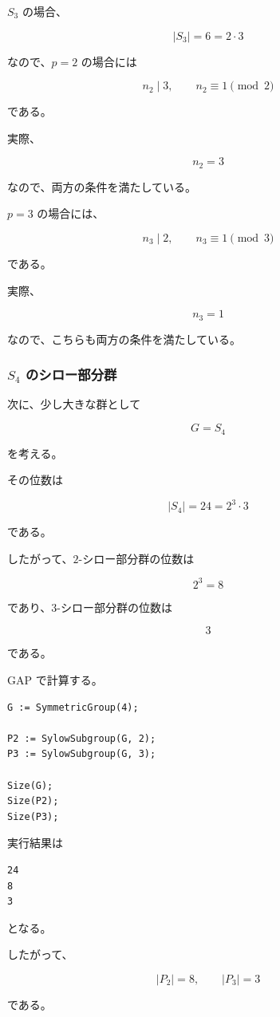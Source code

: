 $S_3$ の場合、

\[
|S_3|=6=2\cdot3
\]

なので、$p=2$ の場合には

\[
n_2\mid3,
\qquad
n_2\equiv1\pmod2
\]

である。

実際、

\[
n_2=3
\]

なので、両方の条件を満たしている。

$p=3$ の場合には、

\[
n_3\mid2,
\qquad
n_3\equiv1\pmod3
\]

である。

実際、

\[
n_3=1
\]

なので、こちらも両方の条件を満たしている。

\subsubsection{$S_4$ のシロー部分群}

次に、少し大きな群として

\[
G=S_4
\]

を考える。

その位数は

\[
|S_4|=24=2^3\cdot3
\]

である。

したがって、$2$-シロー部分群の位数は

\[
2^3=8
\]

であり、$3$-シロー部分群の位数は

\[
3
\]

である。

GAP で計算する。

\begin{lstlisting}[language={}]
G := SymmetricGroup(4);

P2 := SylowSubgroup(G, 2);
P3 := SylowSubgroup(G, 3);

Size(G);
Size(P2);
Size(P3);
\end{lstlisting}

実行結果は

\begin{lstlisting}
24
8
3
\end{lstlisting}

となる。

したがって、

\[
|P_2|=8,\qquad |P_3|=3
\]

である。

